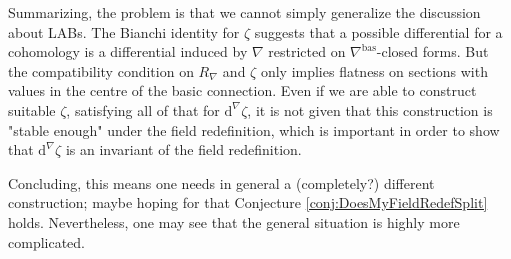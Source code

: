 Summarizing, the problem is that we cannot simply generalize the discussion about LABs. The Bianchi identity for $\zeta$ suggests that a possible differential for a cohomology is a differential induced by $\nabla$ restricted on $\nabla^{\mathrm{bas}}$-closed forms. But the compatibility condition on $R_\nabla$ and $\zeta$ only implies flatness on sections with values in the centre of the basic connection. Even if we are able to construct suitable $\zeta$, satisfying all of that for $\mathrm{d}^\nabla \zeta$, it is not given that this construction is "stable enough" under the field redefinition, which is important in order to show that $\mathrm{d}^\nabla \zeta$ is an invariant of the field redefinition.

Concluding, this means one needs in general a (completely?) different construction; maybe hoping for that Conjecture \ref{conj:DoesMyFieldRedefSplit} holds. Nevertheless, one may see that the general situation is highly more complicated.

